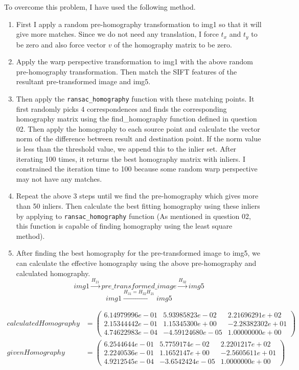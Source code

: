 \documentclass[a4paper]{article}
\begin{document}
To overcome this problem, I have used the following method.
\begin{enumerate}
  \itemsep0em 
  \item First I apply a random pre-homography
   transformation to img1 so that it will give more matches. Since we do not need
    any translation, I force $t_x$ and $t_y$ to be zero and
     also force vector $v$ of the homography matrix to be zero.
  \item Apply the warp perspective transformation to img1 with
   the above random pre-homography transformation. Then match
    the SIFT features of the resultant pre-transformed image 
    and img5.
  \item Then apply the \verb|ransac_homography| function with these matching
   points. It first randomly picks 4 correspondences and finds the
    corresponding homography matrix using the find\_homography
     function defined in question 02. Then apply the homography
      to each source point and calculate the vector norm of
       the difference between result and destination point. If the norm value is less than
        the threshold value, we append this to the inlier set.
         After iterating 100 times, it returns the best homography
          matrix with inliers. I constrained the iteration time to 
          100 because some random warp perspective may not have
           any matches.
  \item Repeat the above 3 steps until we find the pre-homography
   which gives more than 50 inliers. Then calculate the best fitting
    homography using these inliers by applying to \verb|ransac_homography| function 
    (As mentioned in question 02, this function is capable
     of finding homography using the least square method).
  \item After finding the best homography
   for the pre-transformed image to img5,
    we can calculate the effective homography using
     the above pre-homography and calculated homography.
     $$img1 \xrightarrow{H_{21}} pre\_transformed\_image \xrightarrow{H_{32}} img5$$
     $$img1 \xrightarrow{H_{31}=H_{32}H_{21}}  img5$$
\end{enumerate}
\begin{align*}
  calculatedHomography&=
  \begin{pmatrix}
     6.14979996e-01&  5.93985823e-02 & 2.21696291e+02\\
     2.15344442e-01  &1.15345300e+00 &-2.28382302e+01\\
  4.74622983e-04 &-4.59124680e-05&  1.00000000e+00
  \end{pmatrix} \\ givenHomography&=
  \begin{pmatrix}
    6.2544644e-01 &  5.7759174e-02 &  2.2201217e+02\\
    2.2240536e-01 &  1.1652147e+00 & -2.5605611e+01\\
    4.9212545e-04 & -3.6542424e-05 &  1.0000000e+00
  \end{pmatrix}
\end{align*}
\end{document}
